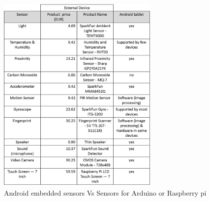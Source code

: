 \begin{figure}[h]
\centering
\includegraphics[width=0.7\textwidth]{Figures/table_sensors}
\caption{Android embedded sensors Vs Sensors for Arduino or Raspberry pi}
\label{table_sensors}
\end{figure}



